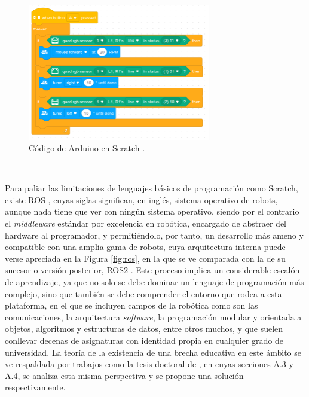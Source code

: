 \begin{figure} [h!]
  \begin{center}
    \includegraphics[width=8cm]{figs/scratch_arduino_code}
  \end{center}
  \caption{Código de Arduino en Scratch \cite{arduino_scratch_code}.}
  \label{fig:scratch}
\end{figure}\

Para paliar las limitaciones de lenguajes básicos de programación como Scratch,
existe ROS \cite{ros}, cuyas siglas significan, en inglés, sistema operativo
de robots, aunque nada tiene que ver con ningún sistema operativo, siendo por el
contrario el \textit{middleware} estándar por excelencia en robótica, encargado
de abstraer del hardware al programador, y permitiéndolo, por tanto, un
desarrollo más ameno y compatible con una amplia gama de robots, cuya
arquitectura interna puede verse apreciada en la Figura \ref{fig:ros}, en la que
se ve comparada con la de su sucesor o versión posterior, ROS2 \cite{ros2}.
Este proceso implica un considerable escalón de aprendizaje, ya que no solo se
debe dominar un lenguaje de programación más complejo, sino que también se debe
comprender el entorno que rodea a esta plataforma, en el que se incluyen campos
de la robótica como son las comunicaciones, la arquitectura \textit{software},
la programación modular y orientada a objetos, algoritmos y estructuras de
datos, entre otros muchos, y que suelen conllevar decenas de asignaturas con
identidad propia en cualquier grado de universidad.
La teoría de la existencia de una brecha educativa en este ámbito se ve
respaldada por trabajos como la tesis doctoral de \cite{vega2018}, en cuyas
secciones A.3 y A.4, se analiza esta misma perspectiva y se propone una solución
respectivamente.

